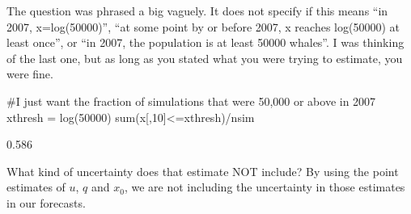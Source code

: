 \begin{wideenumerate}
\smallskip
The question was phrased a big vaguely.  It does not specify if this means ``in 2007, x=log(50000)'', ``at some point by or before 2007, x reaches log(50000) at least once'', or ``in 2007, the population is at least 50000 whales''.  I was thinking of the last one, but as long as you stated what you were trying to estimate, you were fine.
\begin{Schunk}
\begin{Sinput}
 #I just want the fraction of simulations that were 50,000 or above in 2007
 xthresh = log(50000)
 sum(x[,10]<=xthresh)/nsim
\end{Sinput}
\begin{Soutput}
[1] 0.586
\end{Soutput}
\end{Schunk}
\item What kind of uncertainty does that estimate NOT include?
\smallskip
By using the point estimates of $u$, $q$ and $x_0$, we are not including the uncertainty in those estimates in our forecasts.
\end{wideenumerate}

